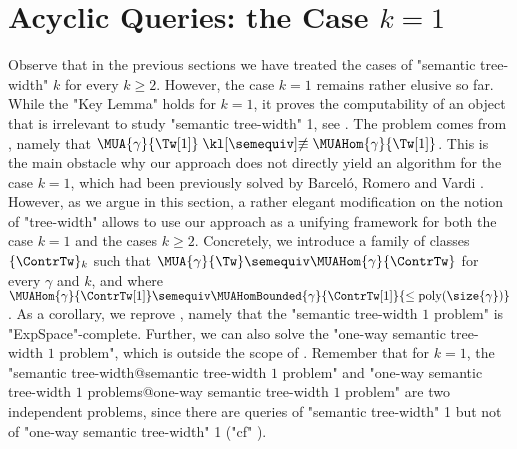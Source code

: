 \section{\AP{}Acyclic Queries: the Case $k=1$}
\label{sec:acyclic-queries}



Observe that in the previous sections we have treated the cases of "semantic tree-width" $k$ for every $k\geq 2$. However, the case $k=1$ remains rather elusive so far. 
While the "Key Lemma" holds for $k=1$, it proves the computability of an object that
is irrelevant to study "semantic tree-width" 1, see . 
The problem comes from , namely that
$\MUA{\gamma}{\Tw[1]} \notsemequiv \MUAHom{\gamma}{\Tw[1]}$.
This is the main obstacle why our approach does not directly yield an algorithm for the case $k=1$, which had been previously solved by Barceló, Romero and Vardi \cite{BarceloRomeroVardi2016SemanticAcyclicity}. 
However, as we argue in this section, a rather elegant modification on the notion of "tree-width" allows to use our approach as a unifying framework for both the case $k=1$ and the cases
$k \geq 2$. 
Concretely, we introduce a family of classes $\set{\ContrTw}_k$ such that 
$\MUA{\gamma}{\Tw} \semequiv \MUAHom{\gamma}{\ContrTw}$ for every $\gamma$ and $k$, and where 
$\MUAHom{\gamma}{\ContrTw[1]} \semequiv \MUAHomBounded{\gamma}{\ContrTw[1]}{\leq\poly(\size{\gamma})}$.
As a corollary, we reprove \cite[Theorem~6.1]{BarceloRomeroVardi2016SemanticAcyclicity}, namely that the "semantic tree-width $1$ problem" is "ExpSpace"-complete. Further, we can also solve the "one-way semantic tree-width $1$ problem", which is outside the scope of \cite{BarceloRomeroVardi2016SemanticAcyclicity}. 
Remember that for $k=1$, the "semantic tree-width@semantic tree-width $1$ problem" and "one-way semantic tree-width $1$ problems@one-way semantic tree-width $1$ problem" are two independent problems, since there are queries of "semantic tree-width" 1 but not of "one-way semantic tree-width" 1 ("cf" ).



